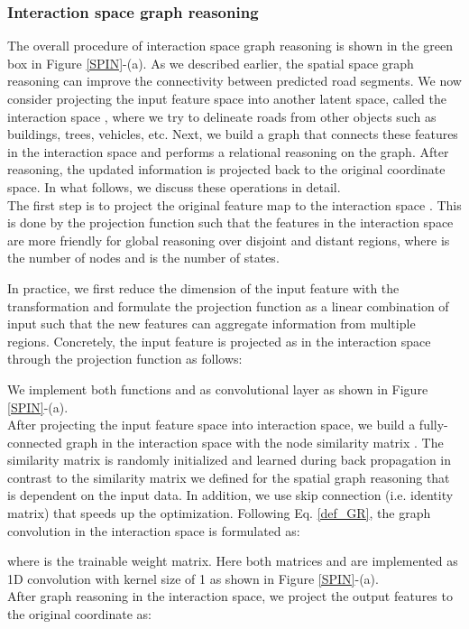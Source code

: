 \documentclass[letterpaper, 10 pt, conference]{ieeeconf}
\begin{document}
\subsubsection{Interaction space graph reasoning}
The overall procedure of interaction space graph reasoning is shown in the green box in Figure \ref{SPIN}-(a). As we described earlier, the spatial space graph reasoning can improve the connectivity between predicted road segments. We now consider projecting the input feature space into another latent space, called the interaction space , where we try to delineate roads from other objects such as buildings, trees, vehicles, etc. Next, we build a graph that connects these features in the interaction space and performs a relational reasoning on the graph. After reasoning, the updated information is projected back to the original coordinate space. In what follows, we discuss these operations in detail.\\
  The first step is to project the original feature map  to the interaction space . This is done by the projection function  such that the features  in the interaction space are more friendly for global reasoning over disjoint and distant regions, where  is the number of nodes and  is the number of states.

In practice, we first reduce the dimension of the input feature  with the transformation  and formulate the projection function  as a linear combination of input  such that the new features can aggregate information from multiple regions. Concretely, the input feature  is projected as  in the interaction space  through the projection function  as follows:

We implement both functions   and  as  convolutional layer as shown in Figure \ref{SPIN}-(a).\\
 After projecting the input feature space into interaction space, we build a fully-connected graph in the interaction space with the node similarity matrix . The similarity matrix  is randomly  initialized and learned during back propagation in contrast to the similarity matrix we defined for the spatial graph reasoning that is dependent on the input data. In addition, we use skip connection (i.e. identity matrix) that speeds up the optimization. Following Eq. \eqref{def_GR}, the graph convolution in the interaction space is formulated as:

where  is the trainable weight matrix. Here both matrices   and  are implemented as 1D convolution with kernel size of 1 as shown in Figure \ref{SPIN}-(a).\\
 After graph reasoning in the interaction space, we project the output features  to the original coordinate as:
\end{document}
